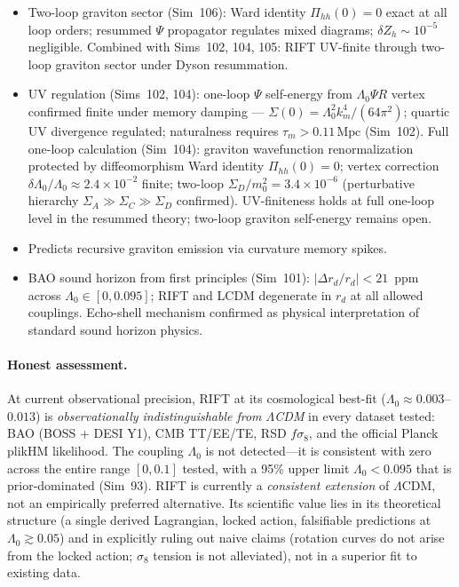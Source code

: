 \documentclass[12pt,a4paper]{article}
\begin{document}
\begin{itemize}
  \item Two-loop graviton sector (Sim~106): Ward identity $\Pi_{hh}(0)=0$ exact at all loop orders; resummed $\Psi$ propagator regulates mixed diagrams; $\delta Z_h\sim10^{-5}$ negligible. Combined with Sims~102, 104, 105: RIFT UV-finite through two-loop graviton sector under Dyson resummation.
  \item UV regulation (Sims~102, 104): one-loop $\Psi$ self-energy from $\Lambda_0\Psi R$ vertex confirmed finite under memory damping --- $\Sigma(0) = \Lambda_0^2 k_m^4/(64\pi^2)$; quartic UV divergence regulated; naturalness requires $\tau_m > 0.11\,\mathrm{Mpc}$ (Sim~102).  Full one-loop calculation (Sim~104): graviton wavefunction renormalization protected by diffeomorphism Ward identity $\Pi_{hh}(0)=0$; vertex correction $\delta\Lambda_0/\Lambda_0 \approx 2.4\times10^{-2}$ finite; two-loop $\Sigma_D/m_0^2 = 3.4\times10^{-6}$ (perturbative hierarchy $\Sigma_A \gg \Sigma_C \gg \Sigma_D$ confirmed).  UV-finiteness holds at full one-loop level in the resummed theory; two-loop graviton self-energy remains open.
  \item Predicts recursive graviton emission via curvature memory spikes.
  \item BAO sound horizon from first principles (Sim~101): $|\Delta r_d/r_d| < 21$~ppm across $\Lambda_0 \in [0, 0.095]$; RIFT and LCDM degenerate in $r_d$ at all allowed couplings. Echo-shell mechanism confirmed as physical interpretation of standard sound horizon physics.
\end{itemize}

\paragraph{Honest assessment.}
At current observational precision, RIFT at its cosmological best-fit
($\Lambda_0 \approx 0.003$--$0.013$) is \emph{observationally indistinguishable
from $\Lambda$CDM} in every dataset tested: BAO (BOSS + DESI Y1), CMB TT/EE/TE,
RSD $f\sigma_8$, and the official Planck plikHM likelihood.  The coupling
$\Lambda_0$ is not detected---it is consistent with zero across the entire
range $[0, 0.1]$ tested, with a 95\% upper limit $\Lambda_0 < 0.095$ that
is prior-dominated (Sim~93).  RIFT is currently a \emph{consistent extension}
of $\Lambda$CDM, not an empirically preferred alternative.  Its scientific
value lies in its theoretical structure (a single derived Lagrangian, locked
action, falsifiable predictions at $\Lambda_0 \gtrsim 0.05$) and in explicitly
ruling out naive claims (rotation curves do not arise from the locked action;
$\sigma_8$ tension is not alleviated), not in a superior fit to existing data.
\end{document}
